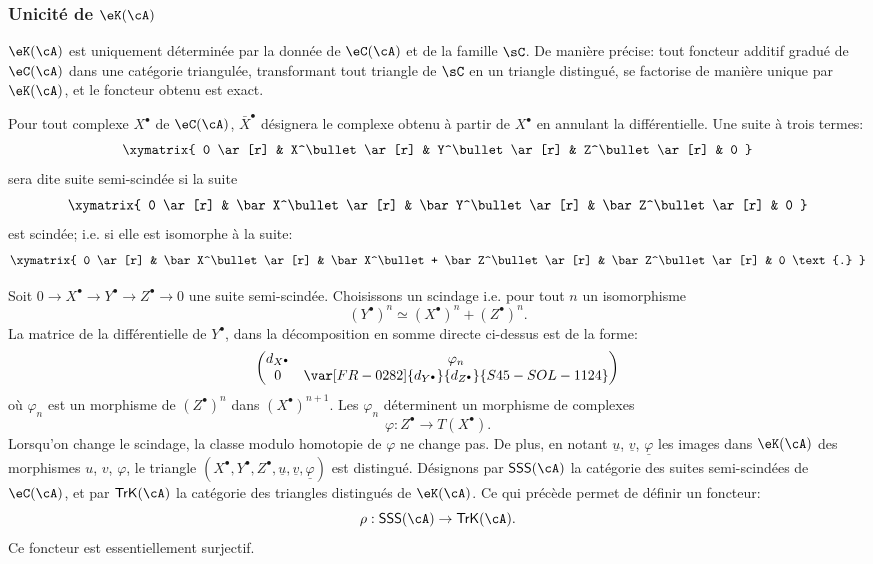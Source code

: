 \subsubsection{Unicité de $\eK(\cA)$}\label{VIII:1-2-4}

$\eK(\cA)$ est uniquement déterminée par la donnée de $\eC(\cA)$ et de la 
famille $\sC$. De manière précise: tout foncteur additif gradué de 
$\eC(\cA)$ dans une catégorie triangulée, transformant tout triangle de 
$\sC$ en un triangle distingué, se factorise de manière unique par 
$\eK(\cA)$, et le foncteur obtenu est exact. 

Pour tout complexe $X^\bullet$ de $\eC(\cA)$, $\bar X^\bullet$ désignera le 
complexe obtenu à partir de $X^\bullet$ en annulant la différentielle. Une 
suite à trois termes: 
\[\xymatrix{
  0 \ar[r] 
    & X^\bullet \ar[r] 
    & Y^\bullet \ar[r] 
    & Z^\bullet \ar[r] 
    & 0 
}\]
sera dite suite semi-scindée si la suite 
\[\xymatrix{
  0 \ar[r] 
    & \bar X^\bullet \ar[r] 
    & \bar Y^\bullet \ar[r] 
    & \bar Z^\bullet \ar[r] 
    & 0 
}\]
est scindée; i.e. si elle est isomorphe à la suite: 
\[\xymatrix{
  0 \ar[r] 
    & \bar X^\bullet \ar[r] 
    & \bar X^\bullet + \bar Z^\bullet \ar[r] 
    & \bar Z^\bullet \ar[r] 
    & 0 \text{.}
}\]

Soit $0 \to X^\bullet \to Y^\bullet \to Z^\bullet \to 0$ une suite 
semi-scindée. Choisissons un scindage i.e. pour tout $n$ un isomorphisme 
\[
  (Y^\bullet)^n \simeq (X^\bullet)^n + (Z^\bullet)^n \text{.}
\]
La matrice de la différentielle de $Y^\bullet$, dans la décomposition en 
somme directe ci-dessus est de la forme: 
\[
  \begin{pmatrix}
    d_{X^\bullet} & \varphi_n \\
    0 & \var[FR-0282]{d_{Y^\bullet}}{d_{Z^\bullet}}{S45-SOL-1124} 
  \end{pmatrix}
\]
où $\varphi_n$ est un morphisme de $(Z^\bullet)^n$ dans 
$(X^\bullet)^{n+1}$. Les $\varphi_n$ déterminent un morphisme de complexes 
\[
  \varphi:Z^\bullet \to T(X^\bullet) \text{.}
\]
Lorsqu'on change le scindage, la classe modulo homotopie de $\varphi$ ne 
change pas. De plus, en notant $\underline u$, $\underline v$, 
$\underline\varphi$ les images dans $\eK(\cA)$ des morphismes $u$, $v$, 
$\varphi$, le triangle 
$(X^\bullet,Y^\bullet,Z^\bullet,\underline u,\underline v,\underline\varphi)$ 
est distingué. Désignons par $\mathsf{SSS}(\cA)$ la catégorie des 
suites semi-scindées de $\eC(\cA)$, et par $\mathsf{TrK}(\cA)$ la 
catégorie des triangles distingués de $\eK(\cA)$. Ce qui précède 
permet de définir un foncteur: 
\[
  \rho:\mathsf{SSS}(\cA) \to \mathsf{TrK}(\cA) \text{.}
\]
Ce foncteur est essentiellement surjectif. 










